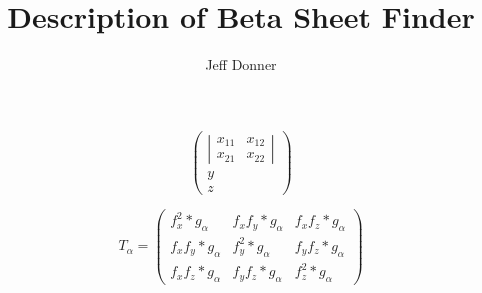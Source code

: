 \documentclass{article}
\begin{document}
\title{Description of Beta Sheet Finder}
\author{Jeff Donner}

\maketitle

\[
\left( \begin{array}{c}
          \left| \begin{array}{cc}
            x_{11} & x_{12} \\
            x_{21} & x_{22}
          \end{array} \right| \\
    y \\
    z \end{array}
  \right)
\]

\[
  T_{\alpha} =
\left( \begin{array}{ccc}
  f_{x}^2*g_{\alpha} & f_{x}f_{y}*g_{\alpha} & f_{x}f_{z}*g_{\alpha} \\
  f_{x}f_{y}*g_{\alpha} & f_{y}^2*g_{\alpha} & f_{y}f_{z}*g_{\alpha} \\
  f_{x}f_{z}*g_{\alpha} & f_{y}f_{z}*g_{\alpha} & f_{z}^2*g_{\alpha}
\end{array} \right)
\]
\end{document}
